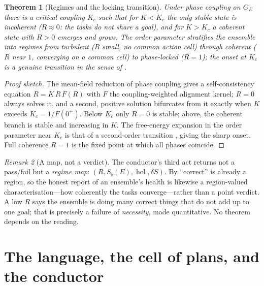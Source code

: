 \documentclass[twocolumn,11pt,a4paper]{article}
\theoremstyle{sup}
\newtheorem{theorem}{Theorem}[section]
\theoremstyle{definition}
\theoremstyle{remark}
\newtheorem{remark}[theorem]{Remark}
\DeclareMathOperator{\hol}{hol}
\newcommand{\Sent}{S}                 %
\newcommand{\Sflat}{S_{\flat}}        %
\newcommand{\Ens}{E}                  %
\newcommand{\contrib}{\delta\Sent}    %
\newcommand{\Rens}{R}                 %
\begin{document}
\begin{theorem}[Regimes and the locking transition]
\label{thm:order}
Under phase coupling on $G_\Ens$ there is a critical coupling $K_c$ such that for
$K<K_c$ the only stable state is incoherent ($\Rens\approx0$: the tasks do not
share a goal), and for $K>K_c$ a coherent state with $\Rens>0$ emerges and grows.
The order parameter stratifies the ensemble into regimes from \emph{turbulent}
($\Rens$ small, no common action cell) through \emph{coherent} ($\Rens$ near $1$,
converging on a common cell) to \emph{phase-locked} ($\Rens=1$); the onset at
$K_c$ is a genuine transition in the sense of \citet{landau1937}.
\end{theorem}

\begin{proof}[Proof sketch]
The mean-field reduction of phase coupling \citep{kuramoto1984,strogatz2000} gives
a self-consistency equation $\Rens=K\,\Rens\,F(\Rens)$ with $F$ the
coupling-weighted alignment kernel; $\Rens=0$ always solves it, and a second,
positive solution bifurcates from it exactly when $K$ exceeds
$K_c=1/F(0^+)$. Below $K_c$ only $\Rens=0$ is stable; above, the coherent branch
is stable and increasing in $K$. The free-energy expansion in the order parameter
near $K_c$ is that of a second-order transition \citep{landau1937}, giving the
sharp onset. Full coherence $\Rens=1$ is the fixed point at which all phases
coincide.
\end{proof}

\begin{remark}[A map, not a verdict]
\label{rem:regimemap}
The conductor's third act returns not a pass/fail but a \emph{regime map}:
$(\Rens,\Sflat(\Ens),\hol,\contrib)$. By  ``correct'' is already a
region, so the honest report of an ensemble's health is likewise a region-valued
characterisation---how coherently the tasks converge---rather than a point verdict.
A low $\Rens$ says the ensemble is doing many correct things that do not add up to
one goal; that is precisely a failure of \emph{necessity}, made quantitative. No
theorem depends on the reading.
\end{remark}

\part{The language, the cell of plans, and the conductor}
\end{document}
